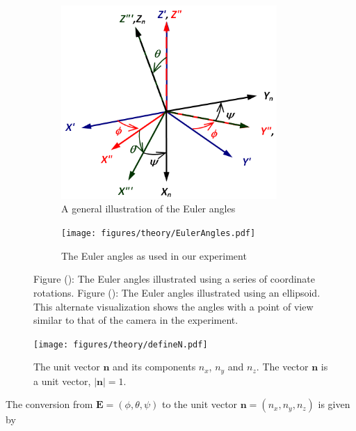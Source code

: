 \begin{figure}[H]
\centering
\begin{subfigure}[b]{0.45\textwidth}
\includegraphics[width=0.9\textwidth]{figures/theory/eulerangles.png}
\caption{A general illustration of the Euler angles}
\label{fig:eulerangles}
\end{subfigure}
\begin{subfigure}[b]{0.45\textwidth}
\texttt{[image: figures/theory/EulerAngles.pdf]}
\caption{The Euler angles as used in our experiment}
\label{fig:eulerparticle}
\end{subfigure}
\caption{Figure (): The Euler angles illustrated using a series of coordinate rotations. 
Figure (): The Euler angles illustrated using an ellipsoid. This alternate visualization shows the angles with a point of view similar to that of the camera in the experiment. }\label{fig:eulerplots}
\end{figure}


\begin{figure}[H]
\begin{center}
\texttt{[image: figures/theory/defineN.pdf]}
\end{center}
\caption{The unit vector $\mathbf{n}$ and its components $n_x$, $n_y$ and $n_z$. The vector $\mathbf{n}$ is a unit vector, $|\mathbf{n}| = 1$.}
\label{fig:nDef}
\end{figure}

The conversion from $\mathbf{E} = (\phi, \theta, \psi)$ to the unit vector $\mathbf{n} = (n_x, n_y, n_z)$ is given by 

